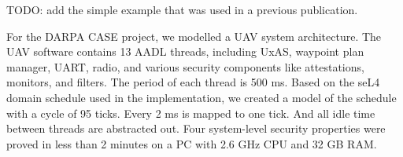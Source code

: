 TODO: add the simple example that was used in a previous publication.

For the DARPA CASE project, we modelled a UAV system architecture. The UAV software contains 13 AADL threads, including UxAS, waypoint plan manager, UART, radio, and various security components like attestations, monitors, and filters. The period of each thread is 500 ms. Based on the seL4 domain schedule used in the implementation, we created a model of the schedule with a cycle of 95 ticks. Every 2 ms is mapped to one tick. And all idle time between threads are abstracted out. Four system-level security properties were proved in less than 2 minutes on a PC with 2.6 GHz CPU and 32 GB RAM.
